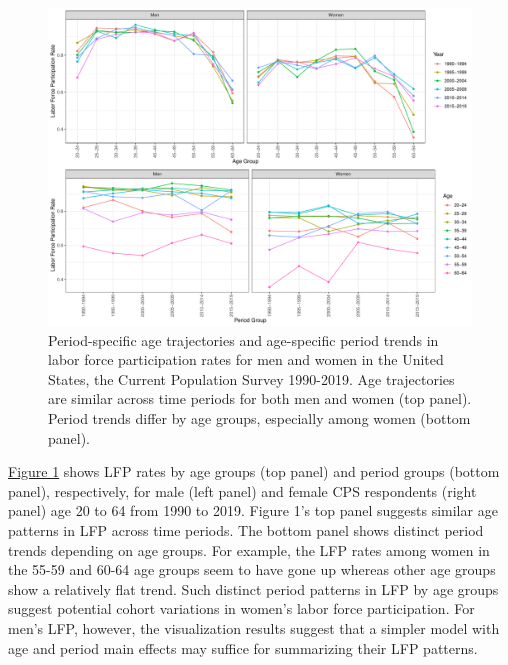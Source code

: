 
\begin{figure}[htbp]
  \centering
  \includegraphics[width=1\linewidth]{figure1.pdf}
  \caption{Period-specific age trajectories and age-specific period trends in labor force participation rates for men and women in the United States, the Current Population Survey 1990-2019. Age trajectories are similar across time periods for both men and women (top panel). Period trends differ by age groups, especially among women (bottom panel).}
  \label{figure:1}
\end{figure}

\hyperref[figure:1]{Figure 1} shows LFP rates by age groups (top panel) and period groups (bottom panel), respectively, for male (left panel) and female CPS respondents (right panel) age 20 to 64 from 1990 to 2019. Figure 1's top panel suggests similar age patterns in LFP across time periods. The bottom panel shows distinct period trends depending on age groups. For example, the LFP rates among women in the 55-59 and 60-64 age groups seem to have gone up whereas other age groups show a relatively flat trend. Such distinct period patterns in LFP by age groups suggest potential cohort variations in women's labor force participation. For men's LFP, however, the visualization results suggest that a simpler model with age and period main effects may suffice for summarizing their LFP patterns. 

